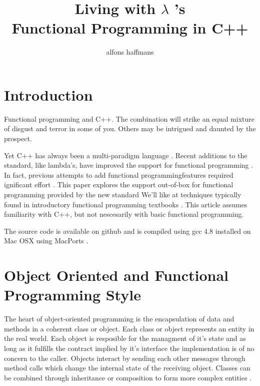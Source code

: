 \documentclass[12pt,fleqn]{article}
\begin{document}
\title{Living  with $\lambda$ 's \\ Functional Programming in C++}
\author {alfons haffmans}
\maketitle

\section* {Introduction}
Functional programming and C++.
The combination will strike an equal mixture of disgust and terror in some of you.
Others may be intrigued and daunted by the prospect.

Yet C++ has always been a multi-paradigm language \cite{stroustrup}.
Recent additions to the standard, like lambda's, have improved the support for functional programming \cite{josuttis}.
In fact, previous attempts to add functional programmingfeatures required ignificant effort \cite{mcnamara}.
This paper explores the support out-of-box for functional programming provided by the new standard
We'll like at techniques typically found in introductory functional programming textbooks \cite{lipovaca, hutton, bird}.
This article assumes familiarity with C++, but not nescesarily with basic functional programming.

The source code is available on github \cite{sourcecode} and is compiled using gcc 4.8 installed on Mac OSX using MacPorts \cite{macports}.


\section*{Object Oriented and Functional Programming Style}
The heart of object-oriented programming is the encapsulation of data and methods in a coherent class or object.
Each class or object represents an entity in the real world. 
Each object is resposible for the managment of it's state and as long as it fulfills the contract implied by it's interface the implementation is of no concern to the caller.
Objects interact by sending each other messages through method calls which change the internal state of the receiving object.
Classes can be combined through inheritance or composition to form more complex entities \cite{designpatterns}. 
\end{document}
